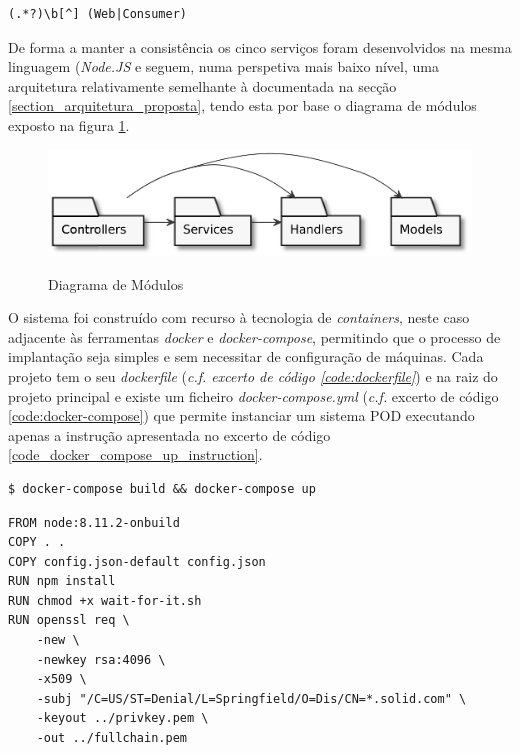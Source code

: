 \begin{lstlisting}[caption={Expressão regular}, label={code_regex_projects_name}]
(.*?)\b[^] (Web|Consumer)
\end{lstlisting}

De forma a manter a consistência os cinco serviços foram desenvolvidos na mesma linguagem (\emph{Node.JS} e seguem, numa perspetiva mais baixo nível, uma arquitetura relativamente semelhante à documentada na secção \ref{section_arquitetura_proposta}, tendo esta por base o diagrama de módulos exposto na figura \ref{implementation_module_diagram}.

\begin{figure}[H]
    \begin{center}
    \includegraphics[width=0.6 \textwidth]{figures/module_diagram.eps}
    \label{implementation_module_diagram}
    \caption{Diagrama de Módulos}
    \end{center}
\end{figure}

O sistema foi construído com recurso à tecnologia de \emph{containers}, neste caso adjacente às ferramentas \emph{docker} e \emph{docker-compose}, permitindo que o processo de implantação seja simples e sem necessitar de configuração de máquinas. Cada projeto tem o seu \emph{dockerfile} (\emph{\emph{c.f.} excerto de código \ref{code:dockerfile}}) e na raiz do projeto principal e existe um ficheiro \emph{docker-compose.yml} (\emph{c.f.} excerto de código \ref{code:docker-compose}) que permite instanciar um sistema POD executando apenas a instrução apresentada no excerto de código \ref{code_docker_compose_up_instruction}.

\begin{lstlisting}[caption={Expressão regular}, label={code_docker_compose_up_instruction}]
$ docker-compose build && docker-compose up
\end{lstlisting}

\begin{lstlisting}[language=docker,caption={Ficheiro Dockerfile},breaklines=true,label={code:dockerfile}]
FROM node:8.11.2-onbuild
COPY . .
COPY config.json-default config.json
RUN npm install
RUN chmod +x wait-for-it.sh
RUN openssl req \
    -new \
    -newkey rsa:4096 \
    -x509 \
    -subj "/C=US/ST=Denial/L=Springfield/O=Dis/CN=*.solid.com" \
    -keyout ../privkey.pem \
    -out ../fullchain.pem
\end{lstlisting}

